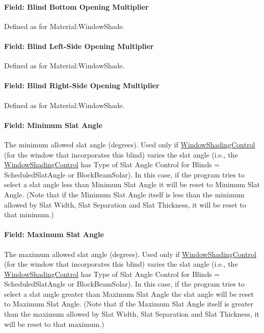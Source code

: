 \paragraph{Field: Blind Bottom Opening Multiplier}\label{field-blind-bottom-opening-multiplier}

Defined as for Material:WindowShade.

\paragraph{Field: Blind Left-Side Opening Multiplier}\label{field-blind-left-side-opening-multiplier}

Defined as for Material:WindowShade.

\paragraph{Field: Blind Right-Side Opening Multiplier}\label{field-blind-right-side-opening-multiplier}

Defined as for Material:WindowShade.

\paragraph{Field: Minimum Slat Angle}\label{field-minimum-slat-angle}

The minimum allowed slat angle (degrees). Used only if \hyperref[windowpropertyshadingcontrol]{WindowShadingControl} (for the window that incorporates this blind) varies the slat angle (i.e., the \hyperref[windowpropertyshadingcontrol]{WindowShadingControl} has Type of Slat Angle Control for Blinds = ScheduledSlatAngle or BlockBeamSolar). In this case, if the program tries to select a slat angle less than Minimum Slat Angle it will be reset to Minimum Slat Angle. (Note that if the Minimum Slat Angle itself is less than the minimum allowed by Slat Width, Slat Separation and Slat Thickness, it will be reset to that minimum.)

\paragraph{Field: Maximum Slat Angle}\label{field-maximum-slat-angle}

The maximum allowed slat angle (degrees). Used only if \hyperref[windowpropertyshadingcontrol]{WindowShadingControl} (for the window that incorporates this blind) varies the slat angle (i.e., the \hyperref[windowpropertyshadingcontrol]{WindowShadingControl} has Type of Slat Angle Control for Blinds = ScheduledSlatAngle or BlockBeamSolar). In this case, if the program tries to select a slat angle greater than Maximum Slat Angle the slat angle will be reset to Maximum Slat Angle. (Note that if the Maximum Slat Angle itself is greater than the maximum allowed by Slat Width, Slat Separation and Slat Thickness, it will be reset to that maximum.)

